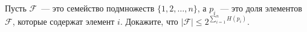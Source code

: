 Пусть $\mathcal{F}$~--- это семейство подмножеств $\{1, 2, \dots, n\}$, а $p_i$~--- это доля элементов $\mathcal{F}$, которые
содержат элемент $i$. Докажите, что $|\mathcal{F}| \le 2^{\sum\limits_{i = 1}^n H(p_i)}$.